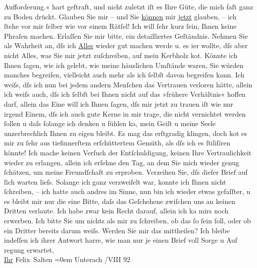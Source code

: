 \begin{ledgroupsized}[t]{13cm}
{{{                     Aufforderung.«}}}\label{K_L03112-11h} hart geſtraft, und nicht zuletzt iſt es Ihre
               Güte, die mich faſt ganz zu Boden drückt. Glauben Sie mir – und Sie \uline{können} mir \uline{jetzt}
               glauben, – ich ſtehe vor mir ſelber wie vor einem Rätſel! Ich will ſehr kurz ſein,
               Ihnen keine Phraſen machen. Erlaſſen Sie mir bitte, ein detailliertes Geſtänd{\pb}nis. Nehmen Sie als
               Wahrheit an, dſs ich \uline{Alles} wieder gut machen werde u.
               es i{\geminationm}er wollte, dſs aber nicht Alles, was Sie mir jetzt
               zuſchreiben, auf mein Kerbholz ko{\geminationm}t. Könnte ich Ihnen
               ſagen, wie ich gelebt, wie meine häuslichen Umſtände waren, Sie würden manches
               begreifen, vielleicht auch mehr als ich ſelbſt davon begreifen kann. \pend
           \pstart
           Ich weiſs, dſs ich nun bei jedem andern Menſchen das Vertrauen verloren hätte, allein
               ich weiſs auch, dſs ich ſelbſt bei Ihnen nicht {\pb}auf das »frühere Verhältnis«
               hoffen darf, allein das Eine will ich Ihnen ſagen, dſs mir jetzt zu trauen iſt wie
               nur irgend Einem, dſs ich auch gute Kerne in mir trage, die nicht vernichtet werden
               ſollen u daſs ſolange ich denken u fühlen ka{\geminationn}, mein
               Geiſt u meine Seele unzerbrechlich Ihnen zu eigen bleibt. \pend
           \pstart
           Es mag das erſtgradig klingen, doch ko{\geminationm}t es mir zu ſehr
               aus tiefinnerſtem erſchüttertem Gemüth, als dſs ich es ſtiliſiren könnte! \pend
           \pstart
           Ich mache keinen Verſuch der Entſchuldigung, keinen Ihre Vertraulichkeit wieder zu
                  er{\pb}langen, allein ich
               erſehne den Tag, an dem Sie mich wieder genug ſchätzen, um meine Freundſchaft zu
               erproben. \pend
           \pstart
           Verzeihen Sie, dſs dieſer Brief auf ſich warten lieſs. Solange ich ganz verzweifelt
               war, konnte ich Ihnen nicht ſchreiben, – ich hatte auch andres im Sinne, nun bin ich
               wieder etwas gefaſſter, u es bleibt mir nur die eine Bitte, daſs das Geſchehene
               zwiſchen uns an keinen Dritten verlaute. Ich habe zwar kein Recht darauf, allein ich
                  ka{\geminationn} mirs noch erwerben. Ich bitte Sie um nichts als
               mir zu ſchreiben, ob das ſo ſein ſoll, oder ob ein {\pb}Dritter bereits darum
               weiſs.\pend
           \pstart
           Werden Sie mir das mittheilen? \pend
           \pstart
           Ich bleibe indeſſen ich ihrer Antwort harre, wie man nur je einen Brief voll
               Sorge u Auf regung erwartet, {\\[\baselineskip]}\uline{Ihr}{ }\spacefill\mbox{Felix Salten}\pend
           \leftskip=0em{}\pstart
           \noindent{}Unterach \pend
           /VIII 92\pend
           

\end{ledgroupsized}
